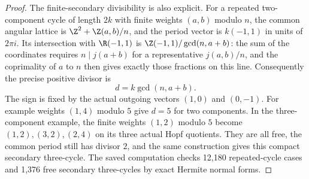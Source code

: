 \begin{proof}
The finite-secondary divisibility is also
explicit. For a repeated two-component
cycle of length $2k$ with finite weights
$(a,b)$ modulo $n$, the common angular
lattice is
$\Z^2+\Z(a,b)/n$, and the period vector is
$k(-1,1)$ in units of $2\pi i$.
Its intersection with $\R(-1,1)$ is
$\Z(-1,1)/\gcd(n,a+b)$: the sum of the
coordinates requires $n\mid j(a+b)$ for
a representative $j(a,b)/n$, and the
coprimality of $a$ to $n$ then gives
exactly those fractions on this line.
Consequently the precise positive divisor is
\[
                    d=k\gcd(n,a+b).
\tag{C.HG.17}
\]
The sign is fixed by the actual outgoing
vectors $(1,0)$ and $(0,-1)$.
For example weights $(1,4)$ modulo $5$
give $d=5$ for two components.
In the three-component example, the
finite weights $(1,2)$ modulo $5$ become
$(1,2),(3,2),(2,4)$ on its three actual
Hopf quotients. They are all free, the
common period still has divisor $2$,
and the same construction gives this
compact secondary three-cycle.
The saved computation checks 12,180
repeated-cycle cases and 1,376 free
secondary three-cycles by exact
Hermite normal forms.
\end{proof}

